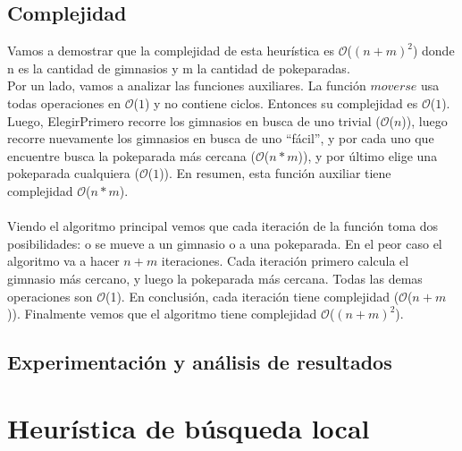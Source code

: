 \documentclass[spanish,12pt]{article}
\begin{document}
\subsection{Complejidad}
Vamos a demostrar que la complejidad de esta heurística es $\mathcal{O}$($(n+m)^2$) donde n es la cantidad de gimnasios y m la cantidad de pokeparadas.\\
Por un lado, vamos a analizar las funciones auxiliares. La función $moverse$ usa todas operaciones en $\mathcal{O}$($1$) y no contiene ciclos. Entonces su complejidad es $\mathcal{O}$($1$).\\
Luego, ElegirPrimero recorre los gimnasios en busca de uno trivial ($\mathcal{O}$($n$)), luego recorre nuevamente los gimnasios en busca de uno ``fácil'', y por cada uno que encuentre busca la pokeparada más cercana ($\mathcal{O}$($n*m$)), y por último elige una pokeparada cualquiera ($\mathcal{O}$($1$)). En resumen, esta función auxiliar tiene complejidad $\mathcal{O}$($n*m$).\\
\\
Viendo el algoritmo principal vemos que cada iteración de la función toma dos posibilidades: o se mueve a un gimnasio o a una pokeparada. En el peor caso el algoritmo va a hacer $n+m$ iteraciones. Cada iteración primero calcula el gimnasio más cercano, y luego la pokeparada más cercana. Todas las demas operaciones son $\mathcal{O}$(1). En conclusión, cada iteración tiene complejidad  ($\mathcal{O}$($n+m$)).
Finalmente vemos que el algoritmo tiene complejidad $\mathcal{O}$($(n+m)^2$).


\subsection{Experimentación y análisis de resultados}




\section{Heurística de búsqueda local}
\end{document}
